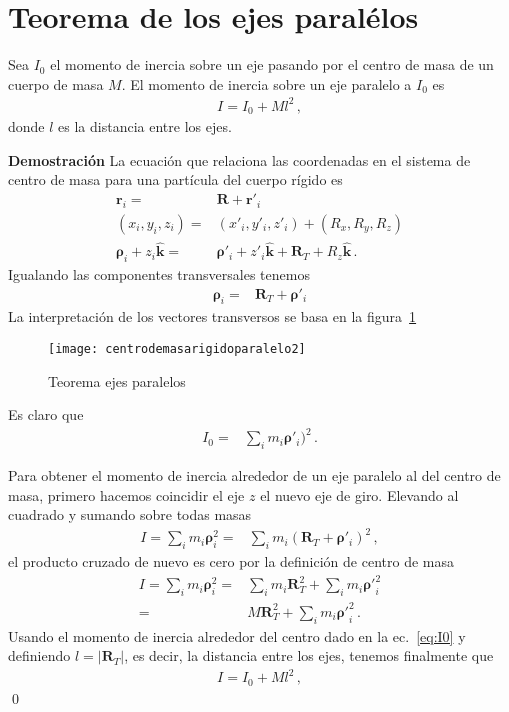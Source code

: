\section{Teorema de los ejes paralélos}

Sea $I_0$ el momento de inercia sobre un eje pasando por el centro de masa de un cuerpo de masa $M$. El momento de inercia sobre un eje paralelo a $I_0$ es
\begin{align}
  I=I_0+M l^2\,,
\end{align}
donde $l$ es la distancia entre los ejes.

\noindent
\textbf{Demostración} La ecuación que relaciona las coordenadas en el sistema de centro de masa para una partícula del cuerpo rígido es
  \begin{align}
    \mathbf{r}_i=&\mathbf{R}+\mathbf{r}'_i\nonumber\\
    (x_i,y_i,z_i)=&(x'_i,y'_i,z'_i)+(R_x,R_y,R_z)\nonumber\\
    \boldsymbol{\rho}_i+z_i\hat{\mathbf{k}}=& \boldsymbol{\rho}'_i+z'_i\hat{\mathbf{k}}+\mathbf{R}_T+R_z\hat{\mathbf{k}}\,.
  \end{align}
Igualando las componentes transversales tenemos
\begin{align}
  \boldsymbol{\rho}_i=& \mathbf{R}_T+\boldsymbol{\rho}'_i
\end{align}
La interpretación de los vectores transversos se basa en la figura~\ref{fig:centrodemasarigidoparalelo}

\begin{frame}
\begin{figure}
  \centering
{\texttt{[image: centrodemasarigidoparalelo2]}}
  \caption{Teorema ejes paralelos}
  \label{fig:centrodemasarigidoparalelo}
\end{figure}
\end{frame}

Es claro que
\begin{align}
\label{eq:I0}
  I_0=&\sum_i m_i\boldsymbol{\rho}'_i)^2\,.
\end{align}

Para obtener el momento de inercia alrededor de un eje paralelo al del centro de masa, primero hacemos coincidir el eje $z$ el nuevo eje de giro. Elevando al cuadrado y sumando sobre todas masas  
\begin{align}
  I=\sum_i m_i\boldsymbol{\rho}_i^2=&\sum_i m_i(\mathbf{R}_T+\boldsymbol{\rho}'_i)^2\,,
\end{align}
el producto cruzado de nuevo es cero por la definición de centro de masa
\begin{align}
  I=\sum_i m_i\boldsymbol{\rho}_i^2=&\sum_i m_i\mathbf{R}_T^2+\sum_i m_i{\boldsymbol{\rho}'}_i^2\nonumber\\
  =&M\mathbf{R}_T^2+\sum_i m_i{\boldsymbol{\rho}'}_i^2\,.
\end{align}
Usando el momento de  inercia alrededor del centro dado en la ec.~\eqref{eq:I0}
y definiendo  $l=\left|\mathbf{R}_T\right|$, es decir, la distancia entre los ejes, tenemos finalmente que
\begin{align}
  I=I_0+M l^2\,,
\end{align}
\qed


